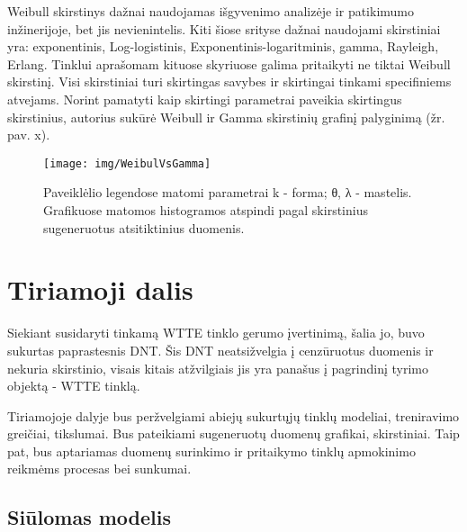 \documentclass{VUMIFPSkursinis}
\begin{document}
Weibull skirstinys dažnai naudojamas išgyvenimo analizėje ir patikimumo inžinerijoje, bet jis nevienintelis. Kiti šiose srityse dažnai naudojami skirstiniai yra: exponentinis, Log-logistinis, Exponentinis-logaritminis, gamma, Rayleigh, Erlang. Tinklui aprašomam kituose skyriuose galima pritaikyti ne tiktai Weibull skirstinį. Visi skirstiniai turi skirtingas savybes ir skirtingai tinkami specifiniems atvejams. Norint pamatyti kaip skirtingi parametrai paveikia skirtingus skirstinius, autorius sukūrė Weibull ir Gamma skirstinių grafinį palyginimą (žr. pav. x).

\begin{figure}[H]
  \centering
  \texttt{[image: img/WeibulVsGamma]}
  \caption{  Paveiklėlio legendose matomi parametrai k - forma; θ, λ - mastelis. Grafikuose matomos histogramos atspindi pagal skirstinius sugeneruotus atsitiktinius duomenis. }
  \label{img:WeibulVsGamma}
\end{figure}


\section{Tiriamoji dalis}

Siekiant susidaryti tinkamą WTTE tinklo gerumo įvertinimą, šalia jo, buvo sukurtas paprastesnis DNT. Šis DNT neatsižvelgia į cenzūruotus duomenis ir nekuria skirstinio, visais kitais atžvilgiais jis yra panašus į pagrindinį tyrimo objektą - WTTE tinklą.

Tiriamojoje dalyje bus peržvelgiami abiejų sukurtųjų tinklų modeliai, treniravimo greičiai, tikslumai. Bus pateikiami sugeneruotų duomenų grafikai, skirstiniai. Taip pat, bus aptariamas duomenų surinkimo ir pritaikymo tinklų apmokinimo reikmėms procesas bei sunkumai.


\subsection{Siūlomas modelis}
\end{document}
